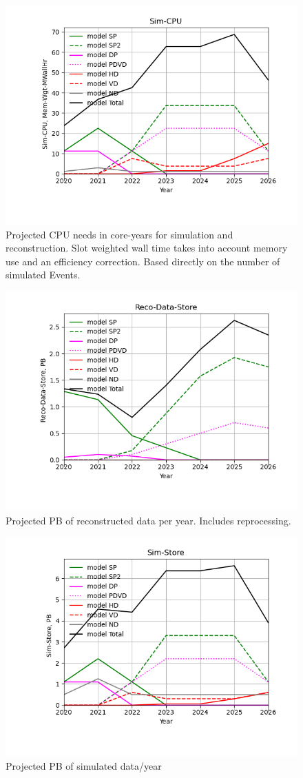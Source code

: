 \begin{figure}[h]
\centering\includegraphics[height=0.4\textwidth]{MoreSim_2022-12-02-2026/MoreSim_2022-12-02-2026-Sim-CPU.png}
\caption{Projected CPU needs in core-years for simulation and reconstruction.              Slot weighted wall time takes into account memory use and an efficiency correction. Based directly on the number of simulated Events.}
\label{fig:Sim-CPU}
\end{figure}
\begin{figure}[h]
\centering\includegraphics[height=0.4\textwidth]{MoreSim_2022-12-02-2026/MoreSim_2022-12-02-2026-Reco-Data-Store.png}
\caption{Projected PB of reconstructed data per year. Includes reprocessing.}
\label{fig:Reco-Data-Store}
\end{figure}
\begin{figure}[h]
\centering\includegraphics[height=0.4\textwidth]{MoreSim_2022-12-02-2026/MoreSim_2022-12-02-2026-Sim-Store.png}
\caption{Projected PB of simulated data/year}
\label{fig:Sim-Store}
\end{figure}
